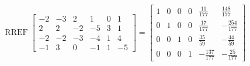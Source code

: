 \begin{exerciseAnswer} 


\[\operatorname{RREF} \left[\begin{array}{cccccc}
-2 & -3 & 2 & 1 & 0 & 1 \\
2 & 2 & -2 & -5 & 3 & 1 \\
-2 & -2 & -3 & -4 & 1 & 4 \\
-1 & 3 & 0 & -1 & 1 & -5
\end{array}\right] = \left[\begin{array}{cccccc}
1 & 0 & 0 & 0 & \frac{11}{177} & \frac{148}{177} \\
0 & 1 & 0 & 0 & \frac{17}{177} & -\frac{254}{177} \\
0 & 0 & 1 & 0 & \frac{35}{59} & -\frac{44}{59} \\
0 & 0 & 0 & 1 & -\frac{137}{177} & -\frac{25}{177}
\end{array}\right] \]



\end{exerciseAnswer}
